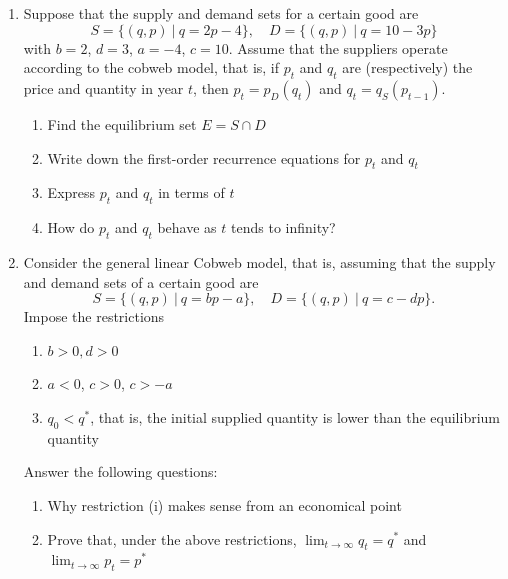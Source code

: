 \documentclass{article}
\begin{document}
\begin{enumerate}[leftmargin = 0.5cm, label = \arabic*., rightmargin = 0.2cm]

    \item Suppose that the supply and demand sets for a certain good are
    \[
    S = \{(q, p)\ |\ q = 2p - 4\}, \quad D = \{(q, p)\ |\ q = 10 - 3p\}
    \]
    with $b = 2$, $d = 3$, $a = -4$, $c = 10$. Assume that the suppliers operate according to the cobweb model, that is, if $p_t$ and $q_t$ are (respectively) the price and quantity in year $t$, then $p_t = p_D(q_t)$ and $q_t = q_S(p_{t-1})$.
    
    \begin{enumerate}[leftmargin = 0.5cm, label = (\alph*), rightmargin = 0.2cm]
        \item Find the equilibrium set \(E = S \cap D\)
        \item Write down the first-order recurrence equations for \(p_t\) and \(q_t\)
        \item Express \(p_t\) and \(q_t\) in terms of \(t\)
        \item How do \(p_t\) and \(q_t\) behave as \(t\) tends to infinity?
    \end{enumerate}
    
    \item Consider the general linear Cobweb model, that is, assuming that the supply and demand sets of a certain good are
    $$
    S = \{(q, p)\ |\ q = bp - a\}, \quad D = \{(q, p)\ |\ q = c - dp\}.
    $$
    Impose the restrictions 
    \begin{enumerate}[leftmargin = 0.5cm, label = (\roman*), rightmargin = 0.2cm]
        \item $b > 0, d > 0$
        \item $a < 0$, $c > 0$, $c > -a$
        \item $q_0 < q^*$, that is, the initial supplied quantity is lower than the equilibrium quantity
    \end{enumerate}
    Answer the following questions:
    \begin{enumerate}[leftmargin = 0.5cm, label = (\alph*), rightmargin = 0.2cm]
        \item Why restriction (i) makes sense from an economical point
        \item Prove that, under the above restrictions, $\lim_{t\rightarrow\infty}q_t = q^*$ and $\lim_{t\rightarrow\infty}p_t = p^*$
    \end{enumerate}
    
    
    
    

\end{enumerate}
\end{document}
